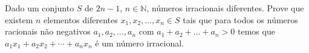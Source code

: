 Dado um conjunto \(S\) de \(2n-1\), \(n\in \mathbb N\), números irracionais diferentes. Prove que existem \(n\) elementos diferentes \(x_1, x_2, \ldots, x_n\in S\) tais que para todos os números racionais não negativos \(a_1, a_2, \ldots, a_n\) com \(a_1+a_2+\ldots + a_n>0\) temos que \(a_1x_1+a_2x_2+\cdots +a_nx_n\) é um número irracional.
